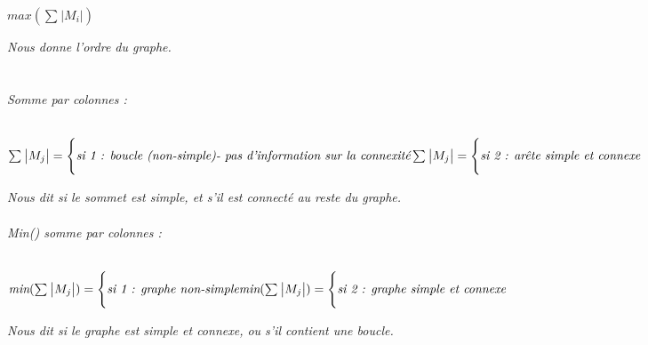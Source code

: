 \documentclass{article}
\begin{document}
\begin{center}
$max(\sum_{}\big|M_{i}\big|)$\\
\end{center}
\textit{Nous donne l'ordre du graphe.}\\\\\\
\textit{Somme par colonnes :}\\\\
\begin{center}
$\sum_{}\big|M_{j}\big| = \Bigg\{  \textit{si 1 : boucle (non-simple)}
\linebreak
\textit{- pas d'information sur la connexité}
\linebreak
\sum_{}\big|M_{j}\big| = \Bigg\{  
\textit{si 2 : arête simple et connexe} \big. $
\end{center}
\textit{Nous dit si le sommet est simple, et s'il est connecté au reste du graphe.}\\\\
\textit{Min() somme par colonnes :}\\\\
\begin{center}
$\textit{min}(\sum_{}\big|M_{j}\big|) = \Bigg\{  \textit{si 1 : graphe non-simple} 
\linebreak
\textit{min}(\sum_{}\big|M_{j}\big|) = \Bigg\{  
\textit{si 2 : graphe simple et connexe} \big. $
\end{center}
\textit{Nous dit si le graphe est simple et connexe, ou s'il contient une boucle.}\\\\
\end{document}
